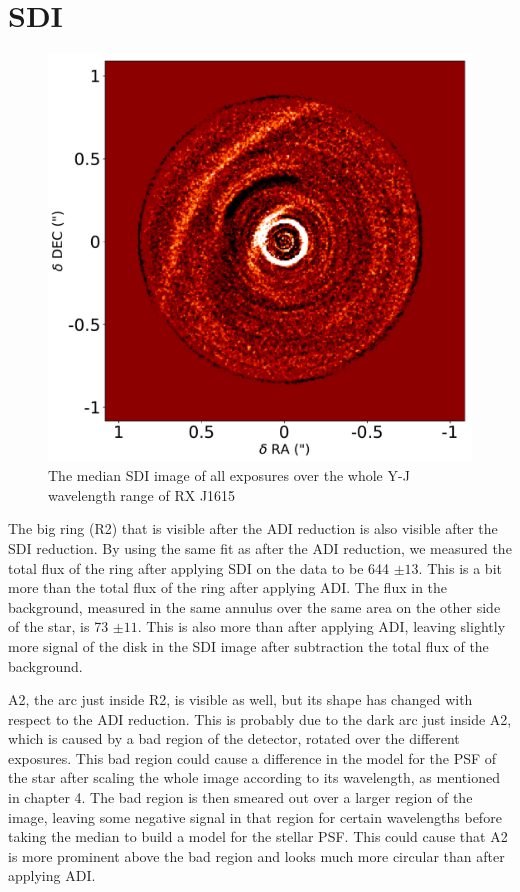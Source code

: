 \documentclass[twoside,single]{lion-msc}
\begin{document}
\clearpage
\section{SDI}
\begin{figure}
\vspace{-0.5 cm}
\centering
\includegraphics[width=\linewidth]{SDI_tot}
\caption{The median SDI image of all exposures over the whole Y-J wavelength range of RX J1615}
\label{fig:SDI_tot}
\vspace{-0.7 cm}
\end{figure}

The big ring (R2) that is visible after the ADI reduction is also visible after the SDI reduction. By using the same fit as after the ADI reduction, we measured the total flux of the ring after applying SDI on the data to be 644 $\pm 13$. This is a bit more than the total flux of the ring after applying ADI. The flux in the background, measured in the same annulus over the same area on the other side of the star, is 73 $\pm 11$. This is also more than after applying ADI, leaving slightly more signal of the disk in the SDI image after subtraction the total flux of the background.  
\bigskip

A2, the arc just inside R2, is visible as well, but its shape has changed with respect to the ADI reduction. This is probably due to the dark arc just inside A2, which is caused by a bad region of the detector, rotated over the different exposures. This bad region could cause a difference in the model for the PSF of the star after scaling the whole image according to its wavelength, as mentioned in chapter 4. The bad region is then smeared out over a larger region of the image, leaving some negative signal in that region for certain wavelengths before taking the median to build a model for the stellar PSF. This could cause that A2 is more prominent above the bad region and looks much more circular than after applying ADI. 
\bigskip
\end{document}
